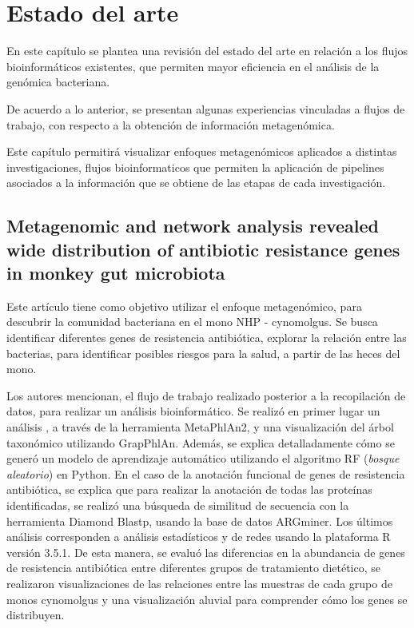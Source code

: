 \documentclass[12pt]{article}
\begin{document}
\newpage
\section{Estado del arte}
En este  capítulo se plantea una revisión del estado del arte en relación a los flujos 
bioinformáticos existentes, que permiten mayor eficiencia en el análisis de la genómica 
bacteriana.

De acuerdo a lo anterior, se presentan algunas experiencias vinculadas a 
flujos de trabajo, con respecto  a la obtención de información metagenómica.

Este capítulo permitirá visualizar enfoques metagenómicos aplicados a 
distintas investigaciones, flujos bioinformaticos que permiten la aplicación de 
pipelines asociados a  la información que se obtiene de las etapas de cada investigación.

\subsection*{Metagenomic and network analysis revealed wide distribution of antibiotic resistance genes in monkey gut microbiota}
Este artículo tiene como objetivo utilizar el enfoque metagenómico, para descubrir la 
comunidad bacteriana en el mono NHP - cynomolgus. Se busca identificar diferentes genes de 
resistencia antibiótica, explorar la relación entre las bacterias, para identificar 
posibles riesgos para la salud, a partir de las heces del mono.

Los autores mencionan, el flujo de trabajo realizado posterior a la recopilación de datos,
para realizar un análisis bioinformático. Se realizó en primer lugar un análisis , a 
través de la herramienta MetaPhlAn2, y una visualización del árbol taxonómico utilizando 
GrapPhlAn. Además, se explica detalladamente cómo se generó un modelo de aprendizaje 
automático utilizando el algoritmo RF (\emph{bosque aleatorio}) en Python.  En el caso de la 
anotación funcional de genes de resistencia antibiótica, se explica que 
para realizar la anotación de todas las proteínas identificadas, se realizó una 
búsqueda de similitud de secuencia con la herramienta Diamond Blastp, usando la 
base de datos ARGminer. Los últimos análisis corresponden a análisis estadísticos y 
de redes usando la plataforma R versión 3.5.1. De esta manera, se evaluó las diferencias en 
la abundancia de genes de resistencia antibiótica entre diferentes grupos de 
tratamiento dietético, se realizaron visualizaciones de las relaciones entre las 
muestras de cada grupo de monos cynomolgus y una visualización aluvial para comprender cómo 
los genes se distribuyen.
\end{document}
